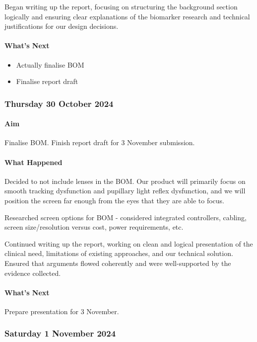 Began writing up the report, focusing on structuring the background section logically and ensuring clear explanations of the biomarker research and technical justifications for our design decisions.

\paragraph{What's Next}
\begin{itemize}
    \item Actually finalise BOM
    \item Finalise report draft
\end{itemize}

\subsubsection*{Thursday 30 October 2024}

\paragraph{Aim}
Finalise BOM. Finish report draft for 3 November submission.

\paragraph{What Happened}
Decided to not include lenses in the BOM. Our product will primarily focus on smooth tracking dysfunction and pupillary light reflex dysfunction, and we will position the screen far enough from the eyes that they are able to focus.

Researched screen options for BOM - considered integrated controllers, cabling, screen size/resolution versus cost, power requirements, etc.

Continued writing up the report, working on clean and logical presentation of the clinical need, limitations of existing approaches, and our technical solution. Ensured that arguments flowed coherently and were well-supported by the evidence collected.

\paragraph{What's Next}
Prepare presentation for 3 November.

\subsubsection*{Saturday 1 November 2024}

